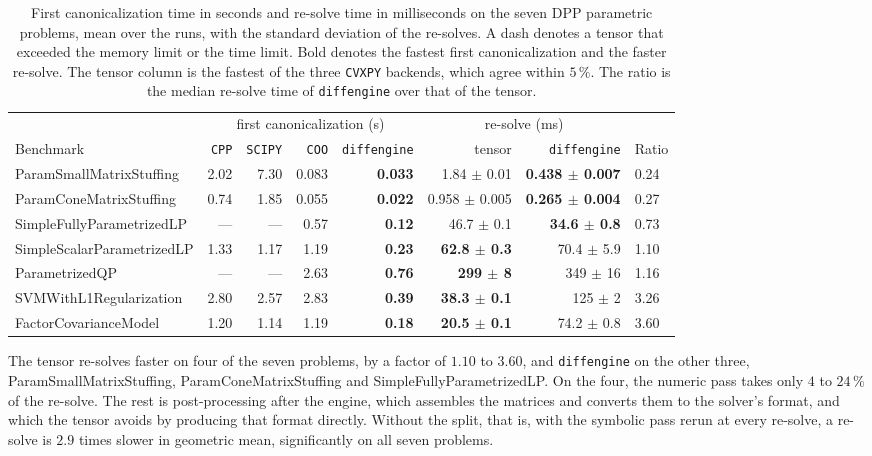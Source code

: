 \begin{table}[htbp]
\centering
\caption[First canonicalization and re-solve on the parametric problems]{First
canonicalization time in seconds and re-solve time in milliseconds on the seven \ac{DPP}
parametric problems, mean over the runs, with the standard deviation of the re-solves. A dash denotes a tensor that exceeded the
memory limit or the time limit. Bold denotes the fastest first canonicalization and the
faster re-solve. The tensor column is the fastest of the three \texttt{CVXPY} backends, which agree within
$5\,\%$. The
ratio is the median re-solve time of \texttt{diffengine} over that of the tensor.}
\label{tab:param-tensor}
{\footnotesize
\setlength{\tabcolsep}{3pt}
\begin{tabular}{l rrrr rr l}
\toprule
& \multicolumn{4}{c}{first canonicalization (s)} & \multicolumn{2}{c}{re-solve (ms)} & \\
\cmidrule(lr){2-5}\cmidrule(lr){6-7}
Benchmark & \texttt{CPP} & \texttt{SCIPY} & \texttt{COO} & \texttt{diffengine}
& tensor & \texttt{diffengine} & Ratio \\
\midrule
ParamSmallMatrixStuffing    & 2.02 & 7.30 & 0.083 & \textbf{0.033} & 1.84 $\pm$ 0.01 & \textbf{0.438 $\pm$ 0.007} & 0.24 \\
ParamConeMatrixStuffing     & 0.74 & 1.85 & 0.055 & \textbf{0.022} & 0.958 $\pm$ 0.005 & \textbf{0.265 $\pm$ 0.004} & 0.27 \\
SimpleFullyParametrizedLP   & --- & --- & 0.57 & \textbf{0.12} & 46.7 $\pm$ 0.1 & \textbf{34.6 $\pm$ 0.8} & 0.73 \\
SimpleScalarParametrizedLP  & 1.33 & 1.17 & 1.19 & \textbf{0.23} & \textbf{62.8 $\pm$ 0.3} & 70.4 $\pm$ 5.9 & 1.10 \\
ParametrizedQP              & --- & --- & 2.63 & \textbf{0.76} & \textbf{299 $\pm$ 8} & 349 $\pm$ 16 & 1.16 \\
SVMWithL1Regularization     & 2.80 & 2.57 & 2.83 & \textbf{0.39} & \textbf{38.3 $\pm$ 0.1} & 125 $\pm$ 2 & 3.26 \\
FactorCovarianceModel       & 1.20 & 1.14 & 1.19 & \textbf{0.18} & \textbf{20.5 $\pm$ 0.1} & 74.2 $\pm$ 0.8 & 3.60 \\
\bottomrule
\end{tabular}}
\end{table}

The tensor re-solves faster on four of the seven problems, by a factor of $1.10$ to $3.60$,
and \texttt{diffengine} on the other three, ParamSmallMatrixStuffing, ParamConeMatrixStuffing
and SimpleFullyParametrizedLP. On the four, the numeric pass takes only $4$ to $24\,\%$ of the
re-solve. The rest is post-processing after the engine, which assembles the matrices and
converts them to the solver's format, and which the tensor avoids by producing that format
directly. Without the split, that is, with the symbolic pass rerun at every re-solve, a re-solve
is $2.9$ times slower in geometric mean, significantly on all seven problems.


